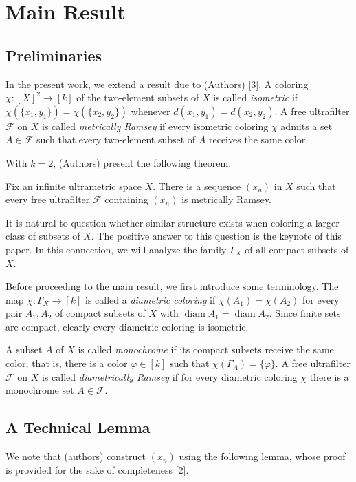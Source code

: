 \section{Main Result}
\subsection{Preliminaries}


In the present work, we extend a result due to (Authors) [3]. A coloring \( \chi : [X]^{2} \to [k] \) of the two-element subsets of \( X \) is called \emph{isometric} if \( \chi (\{ x_1, y_1 \} ) = \chi ( \{ x_2, y_2 \} ) \) whenever \( d(x_1,y_1) = d(x_2, y_2) \). A free ultrafilter \( \mathcal{F}  \) on \( X \) is called \emph{metrically Ramsey} if every isometric coloring \( \chi \) admits a set \( A \in \mathcal{F}  \) such that every two-element subset of \( A \) receives the same color.

With \( k = 2 \), (Authors) present the following theorem.
\begin{theorem}
Fix an infinite ultrametric space \( X \). There is a sequence \( (x_{n}) \) in \( X \) such that every free ultrafilter \( \mathcal{F}  \) containing \( (x_{n}) \) is metrically Ramsey.
\end{theorem}

It is natural to question whether similar structure exists when coloring a larger class of subsets of \( X \). The positive answer to this question is the keynote of this paper. In this connection, we will analyze the family \( \Gamma_{X}  \) of all compact subsets of \( X \).

Before proceeding to the main result, we first introduce some terminology. The map \( \chi : \Gamma_{X}  \to [k] \) is called a \emph{diametric coloring} if \( \chi (A_1) = \chi (A_2) \) for every pair \( A_1, A_2 \) of compact subsets of \( X \) with \( \operatorname{diam} A_1 = \operatorname{diam} A_2  \). Since finite sets are compact, clearly every diametric coloring is isometric.

A subset \( A \) of \( X \) is called \emph{monochrome} if its compact subsets receive the same color; that is, there is a color \( \varphi \in [k] \) such that \( \chi (\Gamma_{A} ) = \{ \varphi  \}  \). A free ultrafilter \( \mathcal{F}  \) on \( X \) is called \emph{diametrically Ramsey} if for every diametric coloring \( \chi \) there is a monochrome set \( A  \in \mathcal{F}  \).

\subsection{A Technical Lemma} We note that (authors) construct \( (x_{n}) \) using the following lemma, whose proof is provided for the sake of completeness [2].


